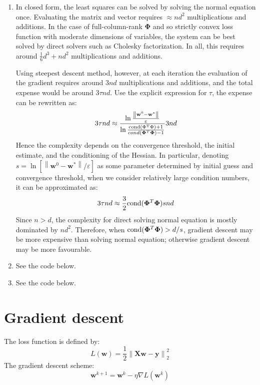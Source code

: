 \documentclass[a4paper, 10pt]{article}
\begin{document}
\begin{enumerate}[resume*]
    \item In closed form, the least squares can be solved by solving the normal equation once. Evaluating the matrix and vector requires $\approx nd^2$ multiplications and additions. In the case of full-column-rank $\bm{\Phi}$ and so strictly convex loss function with moderate dimensions of variables, the system can be best solved by direct solvers such as Cholesky factorization. In all, this requires around $\frac{1}{6}d^3 + nd^2$ multiplications and additions.
    
    Using steepest descent method, however, at each iteration the evaluation of the gradient requires around $3nd$ multiplications and additions, and the total expense would be around $3 \tau n d$. Use the explicit expression for $\tau$, the expense can be rewritten as:
    \begin{equation}
        3\tau nd \approx \frac{\ln \frac{\left\| \mathbf{w}^0 - \mathbf{w}^* \right\|}{\varepsilon}}{\ln \frac{{\rm cond(\bm{\Phi}^T \bm{\Phi}) + 1}}{cond(\bm{\Phi}^T \bm{\Phi}) - 1}} 3nd
    \end{equation}
    Hence the complexity depends on the convergence threshold, the initial estimate, and the conditioning of the Hessian. In particular, denoting $s = \ln [\left\| \mathbf{w}^0 - \mathbf{w}^* \right\|/\varepsilon]$ as some parameter determined by initial guess and convergence threshold, when we consider relatively large condition numbers, it can be approximated as:
    \begin{equation}
        3\tau nd \approx \frac{3}{2}{\rm cond}(\bm{\Phi}^T \bm{\Phi}) s n d
    \end{equation}
    Since $n> d$, the complexity for direct solving normal equation is mostly dominated by $nd^2$. Therefore, when ${\rm cond}(\bm{\Phi}^T \bm{\Phi}) > d/s$, gradient descent may be more expensive than solving normal equation; otherwise gradient descent may be more favourable.
    
    \item See the code below.
    \item See the code below.
    
\end{enumerate}

\section{Gradient descent}
The loss function is defined by:
\begin{equation}
    L(\mathbf{w}) = \frac{1}{2}\left\| \mathbf{X}\mathbf{w} - \mathbf{y} \right\|_2^2
\end{equation}
The gradient descent scheme:
\begin{equation}
    \mathbf{w}^{k+1} = \mathbf{w}^k - \eta \nabla L(\mathbf{w}^k)
\end{equation}
\end{document}
